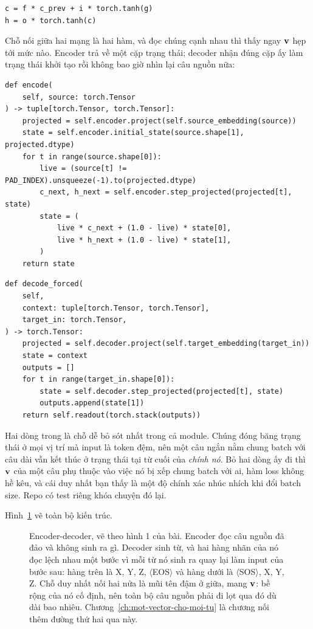\begin{verbatim}
c = f * c_prev + i * torch.tanh(g)
h = o * torch.tanh(c)
\end{verbatim}

%
Chỗ nối giữa hai mạng là hai hàm, và đọc chúng cạnh nhau thì thấy ngay
\(\mathbf{v}\) hẹp tới mức nào. Encoder trả về một cặp trạng thái; decoder nhận
đúng cặp ấy làm trạng thái khởi tạo rồi không bao giờ nhìn lại câu nguồn nữa:

\begin{verbatim}
def encode(
    self, source: torch.Tensor
) -> tuple[torch.Tensor, torch.Tensor]:
    projected = self.encoder.project(self.source_embedding(source))
    state = self.encoder.initial_state(source.shape[1], projected.dtype)
    for t in range(source.shape[0]):
        live = (source[t] != PAD_INDEX).unsqueeze(-1).to(projected.dtype)
        c_next, h_next = self.encoder.step_projected(projected[t], state)
        state = (
            live * c_next + (1.0 - live) * state[0],
            live * h_next + (1.0 - live) * state[1],
        )
    return state
\end{verbatim}

\begin{verbatim}
def decode_forced(
    self,
    context: tuple[torch.Tensor, torch.Tensor],
    target_in: torch.Tensor,
) -> torch.Tensor:
    projected = self.decoder.project(self.target_embedding(target_in))
    state = context
    outputs = []
    for t in range(target_in.shape[0]):
        state = self.decoder.step_projected(projected[t], state)
        outputs.append(state[1])
    return self.readout(torch.stack(outputs))
\end{verbatim}

Hai dòng  trong  là chỗ dễ bỏ sót nhất trong cả module.
Chúng đóng băng trạng thái ở mọi vị trí mà input là token đệm, nên một câu ngắn
nằm chung batch với câu dài vẫn kết thúc ở trạng thái tại từ cuối của
\emph{chính nó}. Bỏ hai dòng ấy đi thì \(\mathbf{v}\) của một câu phụ thuộc vào
việc nó bị xếp chung batch với ai, hàm loss không hề kêu, và cái duy nhất bạn
thấy là một độ chính xác nhúc nhích khi đổi batch size. Repo có test riêng khóa
chuyện đó lại.

Hình~\ref{fig:ch05-encoder-decoder} vẽ toàn bộ kiến trúc.

\begin{figure}[htbp]
  \centering
  
  \caption{Encoder-decoder, vẽ theo hình 1 của bài. Encoder đọc câu nguồn đã
    đảo và không sinh ra gì. Decoder sinh từ, và hai hàng nhãn của nó đọc lệch
    nhau một bước vì mỗi từ nó sinh ra quay lại làm input của bước sau: hàng
    trên là X, Y, Z, \(\langle\)EOS\(\rangle\) và hàng dưới là
    \(\langle\)SOS\(\rangle\), X, Y, Z. Chỗ duy nhất nối hai nửa là mũi tên đậm
    ở giữa, mang \(\mathbf{v}\): bề rộng của nó cố định, nên toàn bộ câu nguồn
    phải đi lọt qua đó dù dài bao nhiêu. Chương~\ref{ch:mot-vector-cho-moi-tu}
    là chương nối thêm đường thứ hai qua  này.}
  \label{fig:ch05-encoder-decoder}
\end{figure}
